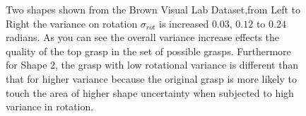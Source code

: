 \documentclass[journal,transmag]{IEEEtran}%
\begin{document}
\begin{figure}%
    \centering
    \qquad
    \caption{Two shapes shown from the Brown Visual Lab Dataset,from Left to Right the variance on rotation $\sigma_{rot}$ is increased $0.03$, $0.12$ to $0.24$ radians.  As you can see the overall variance increase effects the quality of the top grasp in the set of possible grasps. Furthermore for Shape 2, the grasp with low rotational variance is different than that for higher variance because the original grasp is more likely to touch the area of higher shape uncertainty when subjected to high variance in rotation.  }%
    \label{fig:rot_shapes}%
\end{figure}
\end{document}
